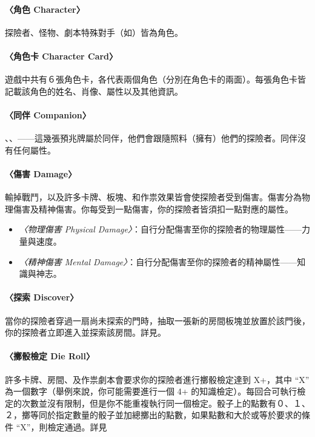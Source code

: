 \paragraph{〈角色 Character〉}
探險者、怪物、劇本特殊對手（如）皆為角色。

\paragraph{〈角色卡 Character Card〉}
遊戲中共有６張角色卡，各代表兩個角色（分別在角色卡的兩面）。每張角色卡皆記載該角色的姓名、肖像、屬性以及其他資訊。

\paragraph{〈同伴 Companion〉}
、、——這幾張預兆牌屬於同伴，他們會跟隨照料（擁有）他們的探險者。同伴沒有任何屬性。

\paragraph{〈傷害 Damage〉}

輸掉戰鬥，以及許多卡牌、板塊、和作祟效果皆會使探險者受到傷害。傷害分為物理傷害及精神傷害。你每受到一點傷害，你的探險者皆須扣一點對應的屬性。

\begin{itemize}
	\item \textit{〈物理傷害 Physical Damage〉}：自行分配傷害至你的探險者的物理屬性——力量與速度。
	\item \textit{〈精神傷害 Mental Damage〉}：自行分配傷害至你的探險者的精神屬性——知識與神志。
\end{itemize}

\paragraph{〈探索 Discover〉}
當你的探險者穿過一扇尚未探索的門時，抽取一張新的房間板塊並放置於該門後，你的探險者立即進入並探索該房間。詳見。

\paragraph{〈擲骰檢定 Die Roll〉}
許多卡牌、房間、及作祟劇本會要求你的探險者進行擲骰檢定達到 X+，其中 “X” 為一個數字（舉例來說，你可能需要進行一個 4+ 的知識檢定）。每回合可執行檢定的次數並沒有限制，但是你不能重複執行同一個檢定。骰子上的點數有０、１、２，擲等同於指定數量的骰子並加總擲出的點數，如果點數和大於或等於要求的條件 “X”，則檢定通過。詳見 


